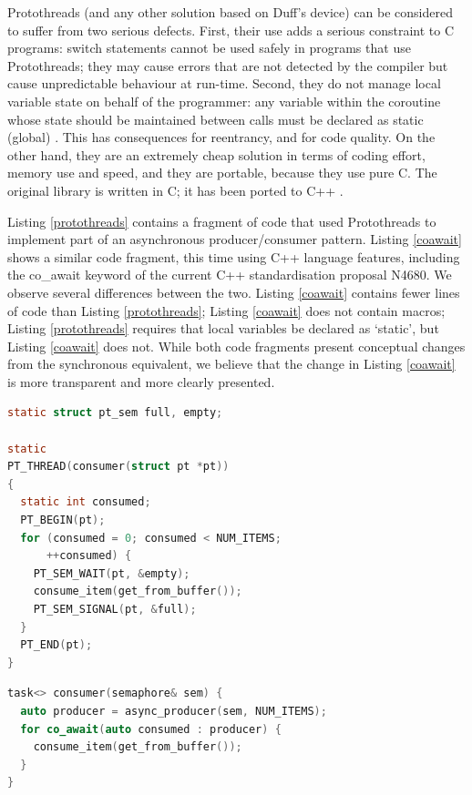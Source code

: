 \documentclass[format=acmsmall, review=false, screen=false]{acmart}
\begin{document}
Protothreads (and any other solution based on Duff’s device) can be considered to suffer from two serious defects. First, their use adds a serious constraint to C programs: switch statements cannot be used safely in programs that use Protothreads; they may cause errors that are not detected by the compiler but cause unpredictable behaviour at run-time. Second, they do not manage local variable state on behalf of the programmer: any variable within the coroutine whose state should be maintained between calls must be declared as static (global) \cite{Dunkels2005b}. This has consequences for reentrancy, and for code quality. On the other hand, they are an extremely cheap solution in terms of coding effort, memory use and speed, and they are portable, because they use pure C. The original library is written in C; it has been ported to C++ \cite{Paisley2006}.

Listing \ref{protothreads} contains a fragment of code that used Protothreads to implement part of an asynchronous producer/consumer pattern. Listing \ref{coawait} shows a similar code fragment, this time using C++ language features, including the co\_await keyword of the current C++ standardisation proposal N4680. We observe several differences between the two. Listing \ref{coawait} contains fewer lines of code than Listing \ref{protothreads}; Listing \ref{coawait} does not contain macros; Listing \ref{protothreads} requires that local variables be declared as ‘static’, but Listing \ref{coawait} does not. While both code fragments present conceptual changes from the synchronous equivalent, we believe that the change in Listing \ref{coawait} is more transparent and more clearly presented.

\begin{lstlisting}[language=C, caption=Fragment of Protothreads code for asynchronous producer/consumer threads, label=protothreads]
static struct pt_sem full, empty;

static
PT_THREAD(consumer(struct pt *pt))
{
  static int consumed;
  PT_BEGIN(pt);
  for (consumed = 0; consumed < NUM_ITEMS; 
      ++consumed) {
    PT_SEM_WAIT(pt, &empty);
    consume_item(get_from_buffer());
    PT_SEM_SIGNAL(pt, &full);
  }
  PT_END(pt);
}
\end{lstlisting}

\begin{lstlisting}[language=C++, caption=C++ code fragment using co\_await for asynchronous producer/consumer threads, label=coawait]
task<> consumer(semaphore& sem) {
  auto producer = async_producer(sem, NUM_ITEMS);
  for co_await(auto consumed : producer) {
    consume_item(get_from_buffer());
  }
}
\end{lstlisting}
\end{document}
